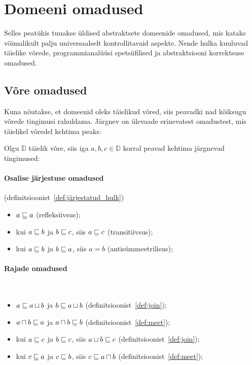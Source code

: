\documentclass[../thesis.tex]{subfiles}
\begin{document}
\section{Domeeni omadused}
Selles peatükis tuuakse üldised abstraktsete domeenide omadused, mis kataks võimalikult palju universaalselt kontrollitavaid aspekte. Nende hulka kuuluvad täielike võrede, programmianalüüsi spetsiifilised ja abstraktsiooni korrektsuse omadused.

\subsection{Võre omadused}
\label{sec:lattice-props}
Kuna nõutakse, et domeenid oleks täielikud võred, siis peavadki nad kõiksugu võrede tingimusi rahuldama. Järgnev on ülevaade erinevatest omadustest, mis täielikel võredel kehtima peaks:

\noindent
Olgu $\mathbb{D}$ täielik võre, siis iga $a, b, c \in \mathbb{D}$ korral peavad kehtima järgnevad tingimused:

\paragraph{Osalise järjestuse omadused} (definitsioonist~\ref{def:järjestatud_hulk})
\begin{itemize}[nosep]
	\item $a \sqsubseteq a$ (refleksiivsus);
	\item kui $a \sqsubseteq b$ ja $b \sqsubseteq c$, siis $a \sqsubseteq c$ (transitiivsus);
	\item kui $a \sqsubseteq b$ ja $b \sqsubseteq a$, siis $a = b$ (antisümmeetrilisus);
\end{itemize}

\paragraph{Rajade omadused}~\cite{might_orders}
\begin{itemize}[nosep]
	\item $a \sqsubseteq a \sqcup b$ ja $b \sqsubseteq a \sqcup b$ (definitsioonist~\ref{def:join});
	\item $a \sqcap b \sqsubseteq a$ ja $a \sqcap b \sqsubseteq b$ (definitsioonist~\ref{def:meet});
	\item kui $a \sqsubseteq c$ ja $b \sqsubseteq c$, siis $a \sqcup b \sqsubseteq c$ (definitsioonist~\ref{def:join});
	\item kui $c \sqsubseteq a$ ja $c \sqsubseteq b$, siis $c \sqsubseteq a \sqcap b$ (definitsioonist~\ref{def:meet});
\end{itemize}
\end{document}
